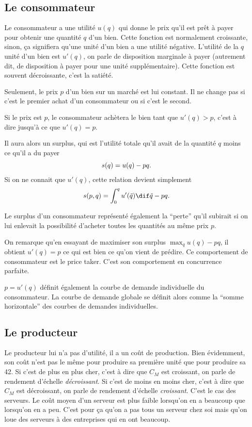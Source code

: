 \subsection{Le consommateur}
Le consommateur a une utilité $u(q)$ qui donne le prix qu'il est prêt à payer
pour obtenir une quantité $q$ d'un bien.
Cette fonction est normalement croissante, sinon, ça signifiera qu'une unité
d'un bien a une utilité négative.
L'utilité de la $q$\ieme{} unité d'un bien est $u'(q)$, on
parle de disposition marginale à payer (autrement dit, de disposition
à payer pour une unité supplémentaire).
Cette fonction est souvent décroissante, c'est la satiété.

Seulement, le prix $p$ d'un bien sur un marché est lui constant.
Il ne change pas si c'est le premier achat d'un consommateur ou si
c'est le second.

Si le prix est $p$, le consommateur achètera le bien tant que
$u'(q) > p$, c'est à dire jusqu'à ce que $u'(q) = p$.

Il aura alors un surplus, qui est l'utilité totale qu'il avait
de la quantité $q$ moins ce qu'il a du payer
\[ s(q) = u(q) - pq. \]
Si on ne connait que $u'(q)$, cette relation devient simplement
\begin{equation}
  \label{eq:surplus_1cons}
  \surplus(p, q) = \int_0^q u'(\tilde{q})\dif \tilde{q} - pq.
\end{equation}

Le surplus d'un consommateur représenté également la ``perte'' qu'il
subirait si on lui enlevait la possibilité d'acheter toutes
les quantités au même prix $p$.

On remarque qu'en essayant de maximiser son surplus $\max_q u(q) - pq$,
il obtient $u'(q) = p$ ce qui est bien ce qu'on vient de prédire.
Ce comportement de consommateur est le price taker.
C'est son comportement en concurrence parfaite.

$p = u'(q)$ définit également la courbe de demande individuelle
du consommateur. La courbe de demande globale se définit alors
comme la ``somme horizontale'' des courbes de demandes individuelles.

\subsection{Le producteur}
Le producteur lui n'a pas d'utilité, il a un coût de production.
Bien évidemment, son coût n'est pas le même pour produire sa première unité
que pour produire sa 42\ieme{}.
Si c'est de plus en plus cher,
c'est à dire que $C_M$ est croissant,
on parle de rendement d'échelle \emph{décroissant}.
Si c'est de moins en moins cher,
c'est à dire que $C_M$ est décroissant,
on parle de rendement d'échelle \emph{croissant}.
C'est le cas des serveurs.
Le coût moyen d'un serveur est plus faible lorsqu'on en a beaucoup que
lorsqu'on en a peu.
C'est pour ça qu'on a pas tous un serveur chez soi mais qu'on loue
des serveurs à des entreprises qui en ont beaucoup.

